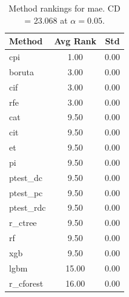 \begin{table}[h]
\centering
\caption{Method rankings for mae. CD = 23.068 at $\alpha=0.05$.}
\label{tab:ranks_mae}
\begin{tabular}{lcc}
\toprule
Method & Avg Rank & Std \\
\midrule
cpi & 1.00 & 0.00 \\
boruta & 3.00 & 0.00 \\
cif & 3.00 & 0.00 \\
rfe & 3.00 & 0.00 \\
cat & 9.50 & 0.00 \\
cit & 9.50 & 0.00 \\
et & 9.50 & 0.00 \\
pi & 9.50 & 0.00 \\
ptest_dc & 9.50 & 0.00 \\
ptest_pc & 9.50 & 0.00 \\
ptest_rdc & 9.50 & 0.00 \\
r_ctree & 9.50 & 0.00 \\
rf & 9.50 & 0.00 \\
xgb & 9.50 & 0.00 \\
lgbm & 15.00 & 0.00 \\
r_cforest & 16.00 & 0.00 \\
\bottomrule
\end{tabular}
\end{table}
